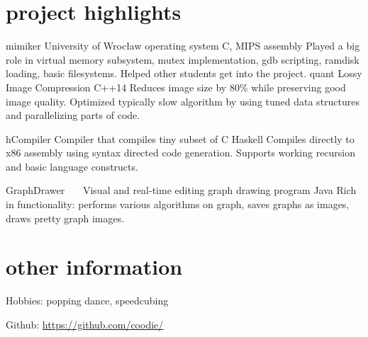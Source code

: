 \documentclass[]{twentysecondcv}
\begin{document}
\section{project highlights}
\begin{twenty}
	\twentyitem
	{mimiker}
	{University of Wrocław operating system}
	{C, MIPS assembly}
	{ Played a big role in virtual memory subsystem, mutex implementation, gdb scripting, ramdisk loading, basic filesystems. Helped other students get into the project. }
	\twentyitem
	{quant}
	{Lossy Image Compression}
	{C++14}
	{Reduces image size by 80\% while preserving good image quality.
	Optimized typically slow algorithm by using tuned data structures and parallelizing parts of code.
	}
	
	\twentyitem
	{hCompiler}
	{Compiler that compiles tiny subset of C}
	{Haskell}
	{Compiles directly to x86 assembly using syntax directed code generation. Supports working recursion and basic language constructs. }
	
	\twentyitem
	{GraphDrawer\ \ \ }
	{Visual and real-time editing graph drawing program}
	{Java}
	{Rich in functionality: performs various algorithms on graph, saves graphs as images, draws pretty graph images.}
	
\end{twenty}


\section{other information}
Hobbies: popping dance, speedcubing

Github: \url{https://github.com/coodie/}


\end{document}
